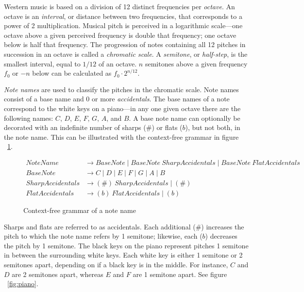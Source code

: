 Western music is based on a division of 12 distinct frequencies per \textit{octave}. An octave is an \textit{interval}, or distance between two frequencies, that corresponds to a power of 2 multiplication. Musical pitch is perceived in a logarithmic scale---one octave above a given perceived frequency is double that frequency; one octave below is half that frequency. The progression of notes containing all 12 pitches in succession in an octave is called a \textit{chromatic scale}. A \textit{semitone}, or \textit{half-step}, is the smallest interval, equal to $1/12$ of an octave. $n$ semitones above a given frequency $f_0$ or $-n$ below can be calculated as $f_0 \cdot 2^{n/12}$.

\textit{Note names} are used to classify the pitches in the chromatic scale. Note names consist of a base name and 0 or more \textit{accidentals}. The base names of a note correspond to the white keys on a piano---in any one given octave there are the following names: $C$, $D$, $E$, $F$, $G$, $A$, and $B$. A base note name can optionally be decorated with an indefinite number of sharps ($\#$) or flats ($b$), but not both, in the note name. This can be illustrated with the context-free grammar in figure ~\ref{fig:cfgnote}.

\begin{figure}[h!]
\begin{center}
\begin{align}
NoteName &\to BaseNote \mid BaseNote\ SharpAccidentals \mid BaseNote\ FlatAccidentals \\
BaseNote &\to C \mid D \mid E \mid F \mid G \mid A \mid B \\
SharpAccidentals &\to (\#)\ SharpAccidentals \mid (\#) \\
FlatAccidentals &\to (b)\ FlatAccidentals \mid (b)
\end{align}
\caption{Context-free grammar of a note name}
\label{fig:cfgnote}
\end{center}
\end{figure}


Sharps and flats are referred to as accidentals. Each additional ($\#$) increases the pitch to which the note name refers by 1 semitone; likewise, each ($b$) decreases the pitch by 1 semitone.  The black keys on the piano represent pitches 1 semitone in between the surrounding white keys. Each white key is either 1 semitone or 2 semitones apart, depending on if a black key is in the middle. For instance, $C$ and $D$ are 2 semitones apart, whereas $E$ and $F$ are 1 semitone apart. See figure ~\ref{fig:piano}.

